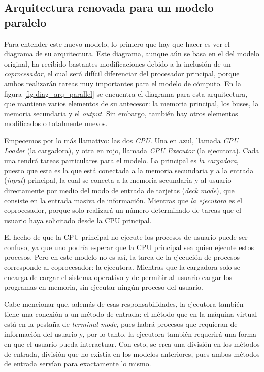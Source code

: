 \documentclass[letterpaper,12pt,oneside]{book}
\begin{document}
	 	\subsection{Arquitectura renovada para un modelo paralelo}
	 	
	 	Para entender este nuevo modelo, lo primero que hay que hacer es ver el diagrama de su arquitectura. Este diagrama,
	 	aunque aún se basa en el del modelo original, ha recibido bastantes modificaciones debido a la inclusión de
	 	un \textit{coprocesador}, el cual será difícil diferenciar del procesador principal, porque ambos realizarán tareas muy importantes
	 	para el modelo de cómputo. En la figura \ref{fig:diag_arq_parallel} se encuentra el diagrama para esta arquitectura, que mantiene 
	 	varios elementos de su antecesor: la 
	 	memoria principal, los buses, la memoria secundaria y el \textit{output}. Sin embargo, también hay otros elementos modificados o totalmente 
	 	nuevos. 
	 	
	 	Empecemos por lo más llamativo: las dos \textit{CPU}. Una en azul, llamada \textit{CPU Loader} (la cargadora), y otra en rojo, llamada
	 	 \textit{CPU Executor} (la ejecutora).
	 	 Cada una tendrá tareas
	 	particulares para el modelo. La principal es \textit{la cargadora}, puesto que esta es la que está conectada a la memoria secundaria y a la
	 	entrada (\textit{input}) principal, la cual se conecta a la memoria secundaria y al usuario directamente por medio del modo de entrada de 
	 	tarjetas (\textit{deck mode}), que consiste en 
	 	la entrada masiva de información. Mientras que \textit{la ejecutora} es el coprocesador, porque solo realizará un número
	 	determinado de tareas que el usuario haya solicitado desde la CPU principal.
   
		
        El hecho de que la CPU principal  no ejecute los procesos de usuario puede ser confuso, ya que uno
        podría esperar que la CPU principal sea quien ejecute estos procesos. Pero en este modelo no es así, la tarea
        de la ejecución de procesos corresponde al coprocesador: la ejecutora. Mientras que la
		 cargadora solo se encarga de cargar el sistema operativo y de  permitir al usuario
		cargar los programas en memoria, sin ejecutar ningún proceso del usuario. 
		
		Cabe mencionar
		que, además de esas responsabilidades, la ejecutora también tiene una conexión a un método de entrada: el método que en la máquina
		virtual está en
		la pestaña de \textit{terminal mode}, pues habrá procesos que requieran de información del usuario 
		y, por lo tanto, la ejecutora también requerirá
		una forma en que el usuario pueda interactuar. Con esto, se crea una división en los métodos de entrada, división que no existía
		en los modelos anteriores, pues ambos métodos de entrada servían para exactamente lo mismo.
		
\end{document}
